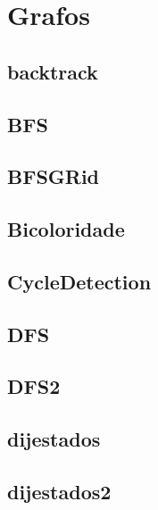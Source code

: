 \section{Grafos}
\subsection{backtrack}
\raggedbottom
\hrulefill
\subsection{BFS}
\raggedbottom
\hrulefill
\subsection{BFSGRid}
\raggedbottom
\hrulefill
\subsection{Bicoloridade}
\raggedbottom
\hrulefill
\subsection{CycleDetection}
\raggedbottom
\hrulefill
\subsection{DFS}
\raggedbottom
\hrulefill
\subsection{DFS2}
\raggedbottom
\hrulefill
\subsection{dijestados}
\raggedbottom
\hrulefill
\subsection{dijestados2}
\raggedbottom
\hrulefill
